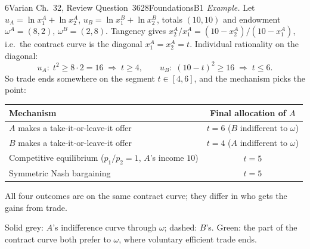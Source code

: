 \begin{exsol}{6}{Varian Ch.~32, Review Question~3}{628}{Foundations}{B1}
\emph{Example.} Let $u_A = \ln x_1^A + \ln x_2^A$, $u_B = \ln x_1^B + \ln x_2^B$, totals
$(10,10)$ and endowment $\omega^A = (8,2)$, $\omega^B = (2,8)$. Tangency gives
$x_2^A/x_1^A = (10-x_2^A)/(10-x_1^A)$, i.e.\ the contract curve is the diagonal
$x_1^A = x_2^A = t$. Individual rationality on the diagonal:
\[
  u_A:\; t^2 \ge 8\cdot 2 = 16 \;\Rightarrow\; t \ge 4, \qquad
  u_B:\; (10-t)^2 \ge 16 \;\Rightarrow\; t \le 6 .
\]
So trade ends somewhere on the segment $t \in [4,6]$, and the mechanism picks the point:
\begin{center}
\begin{tabular}{lc}
\toprule
Mechanism & Final allocation of $A$ \\
\midrule
$A$ makes a take-it-or-leave-it offer & $t = 6$ ($B$ indifferent to $\omega$) \\
$B$ makes a take-it-or-leave-it offer & $t = 4$ ($A$ indifferent to $\omega$) \\
Competitive equilibrium ($p_1/p_2 = 1$, $A$'s income $10$) & $t = 5$ \\
Symmetric Nash bargaining & $t = 5$ \\
\bottomrule
\end{tabular}
\end{center}
All four outcomes are on the same contract curve; they differ in who gets the gains from trade.

\begin{center}
\end{center}
{\footnotesize Solid grey: $A$'s indifference curve through $\omega$; dashed: $B$'s. Green: the
part of the contract curve both prefer to $\omega$, where voluntary efficient trade ends.}


\end{exsol}
